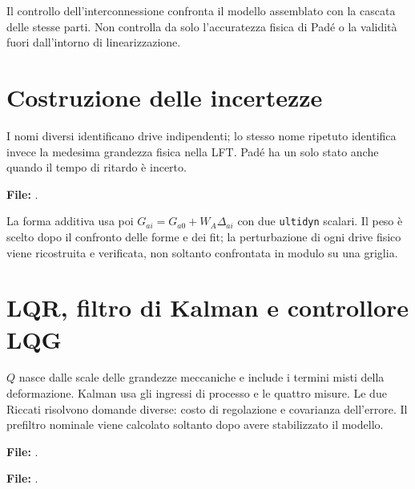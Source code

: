 Il controllo dell'interconnessione confronta il modello assemblato con
la cascata delle stesse parti. Non controlla da solo l'accuratezza fisica
di Padé o la validità fuori dall'intorno di linearizzazione.

\section{Costruzione delle incertezze}
I nomi diversi identificano drive indipendenti; lo stesso nome ripetuto
identifica invece la medesima grandezza fisica nella LFT. Padé ha un
solo stato anche quando il tempo di ritardo è incerto.

\par\medskip\noindent\begin{minipage}{\linewidth}
\noindent\textbf{File:} .

\end{minipage}\par\medskip

La forma additiva usa poi $G_{ai}=G_{a0}+W_A\Delta_{ai}$ con due
\texttt{ultidyn} scalari. Il peso è scelto dopo il confronto delle forme
e dei fit; la perturbazione di ogni drive fisico viene ricostruita e
verificata, non soltanto confrontata in modulo su una griglia.

\section{LQR, filtro di Kalman e controllore LQG}
$Q$ nasce dalle scale delle grandezze meccaniche e include i termini
misti della deformazione. Kalman usa gli ingressi di processo e le quattro
misure. Le due Riccati risolvono domande diverse: costo di regolazione e
covarianza dell'errore. Il prefiltro nominale viene calcolato soltanto
dopo avere stabilizzato il modello.

\par\medskip\noindent\begin{minipage}{\linewidth}
\noindent\textbf{File:} .

\end{minipage}\par\medskip

\par\medskip\noindent\begin{minipage}{\linewidth}
\noindent\textbf{File:} .

\end{minipage}\par\medskip

